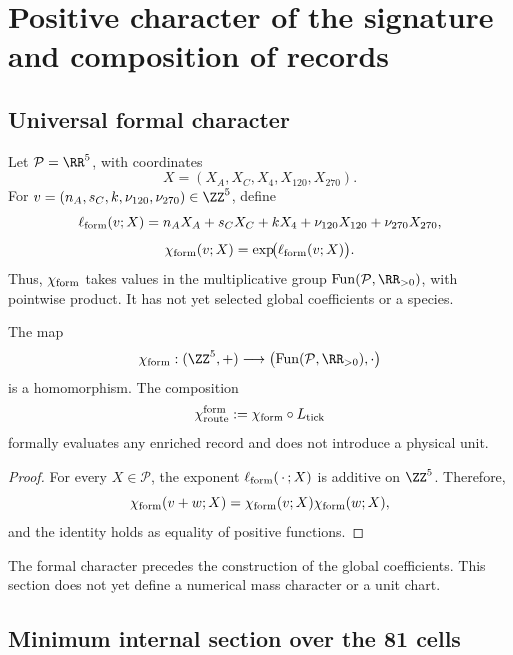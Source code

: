 \chapter{Positive character of the signature and composition of records}
\section{Universal formal character}

Let \(\mathcal P=\RR^5\), with coordinates
\[
 X=(X_A,X_C,X_4,X_{120},X_{270}).
\]
For \(v=(n_A,s_C,k,\nu_{120},\nu_{270})\in\ZZ^5\), define
\[
 \ell_{\rm form}(v;X)
 =n_AX_A+s_CX_C+kX_4
  +\nu_{120}X_{120}+\nu_{270}X_{270},
\]
\[
 \chi_{\rm form}(v;X)=\exp\!\bigl(\ell_{\rm form}(v;X)\bigr).
\]
Thus, \(\chi_{\rm form}\) takes values in the multiplicative group
\(\operatorname{Fun}(\mathcal P,\RR_{>0})\), with pointwise product. It has not yet
selected global coefficients or a species.

\begin{theorem}
\label{thm:caracter-formal-ruta}
The map
\[
 \chi_{\rm form}:(\ZZ^5,+)\longrightarrow
 \bigl(\operatorname{Fun}(\mathcal P,\RR_{>0}),\cdot\bigr)
\]
is a homomorphism. The composition
\[
 \chi_{\rm route}^{\rm form}
 :=\chi_{\rm form}\circ L_{\rm tick}
\]
formally evaluates any enriched record and does not introduce a physical unit.
\end{theorem}

\begin{proof}
For every \(X\in\mathcal P\), the exponent
\(\ell_{\rm form}(\,\cdot\,;X)\) is additive on \(\ZZ^5\). Therefore,
\[
\chi_{\rm form}(v+w;X)
=\chi_{\rm form}(v;X)\chi_{\rm form}(w;X),
\]
and the identity holds as equality of positive functions.
\end{proof}

The formal character precedes the construction of the global coefficients.
This section does not yet define a numerical mass character or a
unit chart.

\section{Minimum internal section over the 81 cells}

